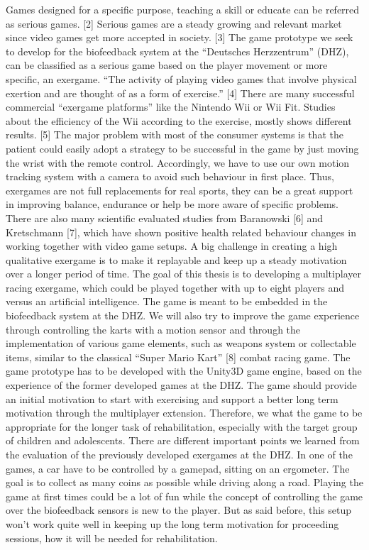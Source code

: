 \begin{multicols}{2}
Games designed for a specific purpose, teaching a skill or educate can be referred as serious games. [2] Serious games are a steady growing and relevant market since video games get more accepted in society. [3] The game prototype we seek to develop for the biofeedback system at the “Deutsches Herzzentrum” (DHZ), can be classified as a serious game based on the player movement or more specific, an exergame. “The activity of playing video games that involve physical exertion and are thought of as a form of exercise.” [4] There are many successful commercial “exergame platforms” like the Nintendo Wii or Wii Fit. Studies about the efficiency of the Wii according to the exercise, mostly shows different results. [5] The major problem with most of the consumer systems is that the patient could easily adopt a strategy to be successful in the game by just moving the wrist with the remote control. Accordingly, we have to use our own motion tracking system with a camera to avoid such behaviour in first place. Thus, exergames are not full replacements for real sports, they can be a great support in improving balance, endurance or help be more aware of specific problems. There are also many scientific evaluated studies from Baranowski [6] and Kretschmann [7], which have shown positive health related behaviour changes in working together with video game setups. A big challenge in creating a high qualitative exergame is to make it replayable and keep up a steady motivation over a longer period of time. The goal of this thesis is to developing a multiplayer racing exergame, which could be played together with up to eight players and versus an artificial intelligence. The game is meant to be embedded in the biofeedback system at the DHZ. We will also try to improve the game experience through controlling the karts with a motion sensor and through the implementation of various game elements, such as weapons system or collectable items, similar to the classical “Super Mario Kart” [8] combat racing game. The game prototype has to be developed with the Unity3D game engine, based on the experience of the former developed games at the DHZ. The game should provide an initial motivation to start with exercising and support a better long term motivation through the multiplayer extension. Therefore, we what the game to be appropriate for the longer task of rehabilitation, especially with the target group of children and adolescents. There are different important points we learned from the evaluation of the previously developed
exergames at the DHZ. In one of the games, a car have to be controlled by a gamepad, sitting on an ergometer. The goal is to collect as many coins as possible while driving along a road. Playing the game at first times could be a lot of fun while the concept of controlling the game over the biofeedback sensors is new to the player. But as said before, this setup won't work quite well in keeping up the long term motivation for proceeding sessions, how it will be needed for rehabilitation.\cite[p. 12ff ]{Goe2010}


\end{multicols}
